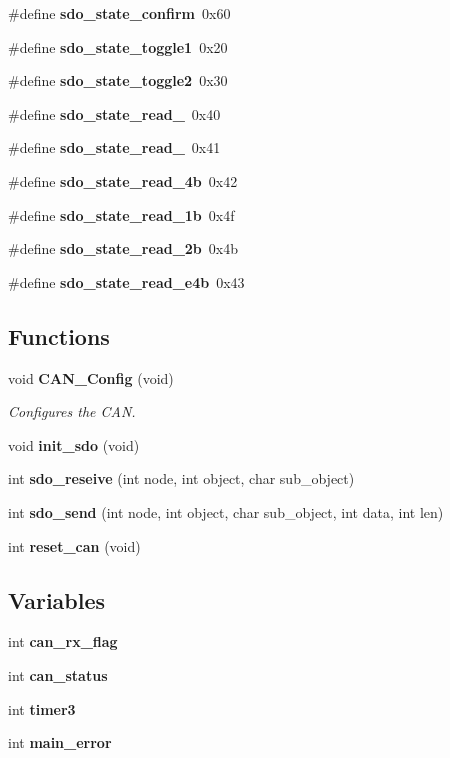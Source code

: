 \begin{DoxyCompactItemize}
\#define \textbf{ sdo\+\_\+state\+\_\+confirm}~0x60
\item 
\#define \textbf{ sdo\+\_\+state\+\_\+toggle1}~0x20
\item 
\#define \textbf{ sdo\+\_\+state\+\_\+toggle2}~0x30
\item 
\#define \textbf{ sdo\+\_\+state\+\_\+read\+\_}~0x40
\item 
\#define \textbf{ sdo\+\_\+state\+\_\+read\+\_}~0x41
\item 
\#define \textbf{ sdo\+\_\+state\+\_\+read\+\_\+4b}~0x42
\item 
\#define \textbf{ sdo\+\_\+state\+\_\+read\+\_\+1b}~0x4f
\item 
\#define \textbf{ sdo\+\_\+state\+\_\+read\+\_\+2b}~0x4b
\item 
\#define \textbf{ sdo\+\_\+state\+\_\+read\+\_\+e4b}~0x43
\end{DoxyCompactItemize}
\subsection*{Functions}
\begin{DoxyCompactItemize}
\item 
void \textbf{ C\+A\+N\+\_\+\+Config} (void)
\begin{DoxyCompactList}\small\item\em Configures the C\+AN. \end{DoxyCompactList}\item 
void \textbf{ init\+\_\+sdo} (void)
\item 
int \textbf{ sdo\+\_\+reseive} (int node, int object, char sub\+\_\+object)
\item 
int \textbf{ sdo\+\_\+send} (int node, int object, char sub\+\_\+object, int data, int len)
\item 
int \textbf{ reset\+\_\+can} (void)
\end{DoxyCompactItemize}
\subsection*{Variables}
\begin{DoxyCompactItemize}
\item 
int \textbf{ can\+\_\+rx\+\_\+flag}
\item 
int \textbf{ can\+\_\+status}
\item 
int \textbf{ timer3}
\item 
int \textbf{ main\+\_\+error}
\end{DoxyCompactItemize}


